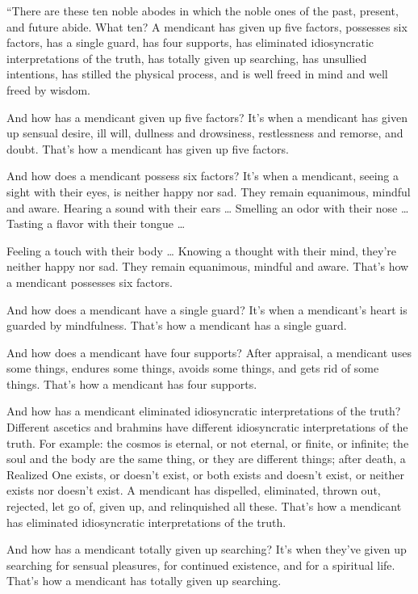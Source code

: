 \documentclass[12pt,openany]{book}%
\begin{document}
“There are these ten noble abodes in which the noble ones of the past, present, and future abide. What ten? A mendicant has given up five factors, possesses six factors, has a single guard, has four supports, has eliminated idiosyncratic interpretations of the truth, has totally given up searching, has unsullied intentions, has stilled the physical process, and is well freed in mind and well freed by wisdom. 

And how has a mendicant given up five factors? It’s when a mendicant has given up sensual desire, ill will, dullness and drowsiness, restlessness and remorse, and doubt. That’s how a mendicant has given up five factors. 

And how does a mendicant possess six factors? It’s when a mendicant, seeing a sight with their eyes, is neither happy nor sad. They remain equanimous, mindful and aware. Hearing a sound with their ears … Smelling an odor with their nose … Tasting a flavor with their tongue … 

Feeling a touch with their body … Knowing a thought with their mind, they’re neither happy nor sad. They remain equanimous, mindful and aware. That’s how a mendicant possesses six factors. 

And how does a mendicant have a single guard? It’s when a mendicant’s heart is guarded by mindfulness. That’s how a mendicant has a single guard. 

And how does a mendicant have four supports? After appraisal, a mendicant uses some things, endures some things, avoids some things, and gets rid of some things. That’s how a mendicant has four supports. 

And how has a mendicant eliminated idiosyncratic interpretations of the truth? Different ascetics and brahmins have different idiosyncratic interpretations of the truth. For example: the cosmos is eternal, or not eternal, or finite, or infinite; the soul and the body are the same thing, or they are different things; after death, a Realized One exists, or doesn’t exist, or both exists and doesn’t exist, or neither exists nor doesn’t exist. A mendicant has dispelled, eliminated, thrown out, rejected, let go of, given up, and relinquished all these. That’s how a mendicant has eliminated idiosyncratic interpretations of the truth. 

And how has a mendicant totally given up searching? It’s when they’ve given up searching for sensual pleasures, for continued existence, and for a spiritual life. That’s how a mendicant has totally given up searching. 
\end{document}
